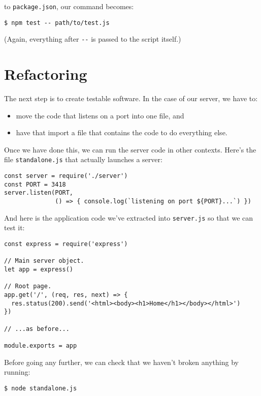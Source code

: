 \noindent
to \texttt{package.json}, our command becomes:

\begin{verbatim}
$ npm test -- path/to/test.js
\end{verbatim}

(Again, everything after \texttt{-\/-} is passed to the script itself.)

\section{Refactoring}\label{s:testing-refactoring}

The next step is to create testable software.
In the case of our server,
we have to:

\begin{itemize}
\item
  move the code that listens on a port into one file, and
\item
  have that import a file that contains the code to do everything else.
\end{itemize}

Once we have done this,
we can run the server code in other contexts.
Here's the file \texttt{standalone.js} that actually launches a server:

\begin{verbatim}
const server = require('./server')
const PORT = 3418
server.listen(PORT,
              () => { console.log(`listening on port ${PORT}...`) })
\end{verbatim}

\noindent
And here is the application code we've extracted into \texttt{server.js}
so that we can test it:

\begin{verbatim}
const express = require('express')

// Main server object.
let app = express()

// Root page.
app.get('/', (req, res, next) => {
  res.status(200).send('<html><body><h1>Home</h1></body></html>')
})

// ...as before...

module.exports = app
\end{verbatim}

Before going any further,
we can check that we haven't broken anything by running:

\begin{verbatim}
$ node standalone.js
\end{verbatim}

